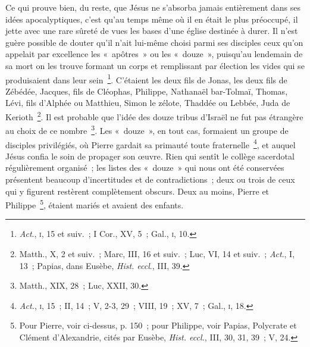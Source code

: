 \documentclass[french,twoside]{book} %
\newcommand\chaptercont{} %
\begin{document}
\chaptercont
\noindent Ce qui prouve bien, du reste, que Jésus ne s’absorba jamais entièrement dans ses idées apocalyptiques, c’est qu’au temps même où il en était le plus préoccupé, il jette avec une rare sûreté de vues les bases d’une église destinée à durer. Il n’est guère possible de douter qu’il n’ait lui-même choisi parmi ses disciples ceux qu’on appelait par excellence les « apôtres » ou les « douze », puisqu’au lendemain de sa mort on les trouve formant un corps et remplissant par élection les vides qui se produisaient dans leur sein \footnote{{\itshape Act}., \textsc{i}, 15 et suiv. ; I Cor., XV, 5 ; Gal., \textsc{i}, 10.}. C’étaient les deux fils de Jonas, les deux fils de Zébédée, Jacques, fils de Cléophas, Philippe, Nathanaël bar-Tolmaï, Thomas, Lévi, fils d’Alphée ou Matthieu, Simon le zélote, Thaddée ou Lebbée, Juda de Kerioth \footnote{ Matth., X, 2 et suiv. ; Marc, III, 16 et suiv. ; Luc, VI, 14 et suiv. ; {\itshape Act}., I, 13 ; Papias, dans Eusèbe, {\itshape Hist. eccl}., III, 39.}. Il est probable que l’idée des douze tribus d’Israël ne fut pas étrangère au choix de ce nombre \footnote{Matth., XIX, 28 ; Luc, XXII, 30.}. Les « douze », en tout cas, formaient un groupe de disciples privilégiés, où Pierre gardait sa primauté toute fraternelle \footnote{{\itshape Act.}, \textsc{i}, 15 ; II, 14 ; V, 2-3, 29 ; VIII, 19 ; XV, 7 ; Gal., \textsc{i}, 18.}, et auquel Jésus confia le soin de propager son œuvre. Rien qui sentît le collège sacerdotal régulièrement organisé ; les listes des « douze » qui nous ont été conservées présentent beaucoup d’incertitudes et de contradictions ; deux ou trois de ceux qui y figurent restèrent complètement obscurs. Deux au moins, Pierre et Philippe \footnote{ Pour Pierre, voir ci-dessus, p. 150 ; pour Philippe, voir Papias, Polycrate et Clément d’Alexandrie, cités par Eusèbe, {\itshape Hist. eccl.}, III, 30, 31, 39 ; V, 24.}, étaient mariés et avaient des enfants.\par
\end{document}
